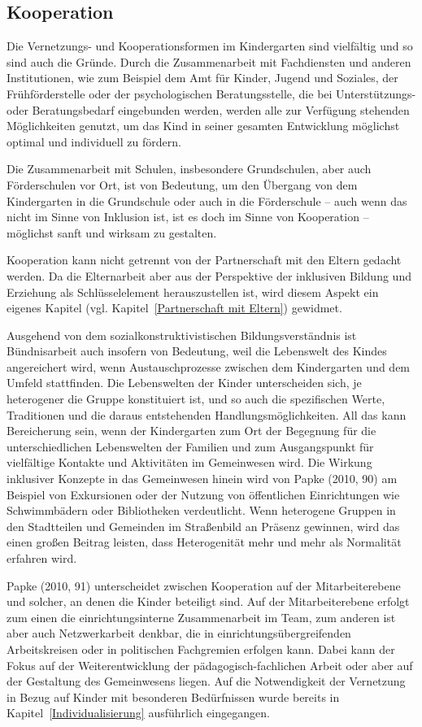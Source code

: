 \subsection{Kooperation}
\label{Kooperation}
Die Vernetzungs- und Kooperationsformen im Kindergarten sind vielfältig und so sind auch die Gründe. 
Durch die Zusammenarbeit mit Fachdiensten und anderen Institutionen, wie zum Beispiel dem Amt für Kinder, Jugend und Soziales, der Frühförderstelle oder der psychologischen Beratungsstelle, die bei Unterstützungs- oder Beratungsbedarf eingebunden werden, werden alle zur Verfügung stehenden Möglichkeiten genutzt, um das Kind in seiner gesamten Entwicklung möglichst optimal und individuell zu fördern.

Die Zusammenarbeit mit Schulen, insbesondere Grundschulen, aber auch Förderschulen vor Ort, ist von Bedeutung, um den Übergang von dem Kindergarten in die Grundschule oder auch in die Förderschule -- auch wenn das nicht im Sinne von Inklusion ist, ist es doch im Sinne von Kooperation -- möglichst sanft und wirksam zu gestalten. 

Kooperation kann nicht getrennt von der Partnerschaft mit den Eltern gedacht werden. Da die Elternarbeit aber aus der Perspektive der inklusiven Bildung und Erziehung als Schlüsselelement herauszustellen ist, wird diesem Aspekt ein eigenes Kapitel (vgl. Kapitel~\ref{Partnerschaft mit Eltern}) gewidmet. 

Ausgehend von dem sozialkonstruktivistischen Bildungsverständnis ist Bündnisarbeit auch insofern von Bedeutung, weil die Lebenswelt des Kindes angereichert wird, wenn Austauschprozesse zwischen dem Kindergarten und dem Umfeld stattfinden. Die Lebenswelten der Kinder unterscheiden sich, je heterogener die Gruppe konstituiert ist, und so auch die spezifischen Werte, Traditionen und die daraus entstehenden Handlungsmöglichkeiten. All das kann Bereicherung sein, wenn der Kindergarten zum Ort der Begegnung für die unterschiedlichen Lebenswelten der Familien und zum Ausgangspunkt für vielfältige Kontakte und Aktivitäten im Gemeinwesen wird.  
Die Wirkung inklusiver Konzepte in das Gemeinwesen hinein wird von Papke (2010, 90) am Beispiel von Exkursionen oder der Nutzung von öffentlichen Einrichtungen wie Schwimmbädern oder Bibliotheken verdeutlicht. Wenn heterogene Gruppen in den Stadtteilen und Gemeinden im Straßenbild an Präsenz gewinnen, wird das einen großen Beitrag leisten, dass Heterogenität mehr und mehr als Normalität erfahren wird.   
 
Papke (2010, 91) unterscheidet zwischen Kooperation auf der Mitarbeiterebene und solcher, an denen die Kinder beteiligt sind. Auf der Mitarbeiterebene erfolgt zum einen die einrichtungsinterne Zusammenarbeit im Team, zum anderen ist aber auch Netzwerkarbeit denkbar, die in einrichtungsübergreifenden Arbeitskreisen oder in politischen Fachgremien erfolgen kann. Dabei kann der Fokus auf der Weiterentwicklung der pädagogisch-fachlichen Arbeit oder aber auf der Gestaltung des Gemeinwesens liegen.
Auf die Notwendigkeit der Vernetzung in Bezug auf Kinder mit besonderen Bedürfnissen wurde bereits in Kapitel~\ref{Individualisierung} ausführlich eingegangen.     

